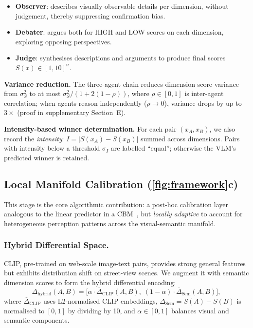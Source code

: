 \documentclass[runningheads]{llncs}
\begin{document}
\begin{itemize}
\item \textbf{Observer}: describes visually observable details per dimension, without judgement, thereby suppressing confirmation bias.
\item \textbf{Debater}: argues both for HIGH and LOW scores on each dimension, exploring opposing perspectives.
\item \textbf{Judge}: synthesises descriptions and arguments to produce final scores $S(x)\in[1,10]^{n}$.
\end{itemize}

\noindent\textbf{Variance reduction.}
The three-agent chain reduces dimension score variance from $\sigma_S^2$ to at most $\sigma_S^2/(1{+}2(1{-}\rho))$, where $\rho\in[0,1]$ is inter-agent correlation; when agents reason independently ($\rho{\to}0$), variance drops by up to $3\times$ (proof in supplementary Section~E).

\smallskip\noindent\textbf{Intensity-based winner determination.}
For each pair $(x_A, x_B)$, we also record the \emph{intensity}: $I{=}|S(x_A) - S(x_B)|$ summed across dimensions.
Pairs with intensity below a threshold $\sigma_I$ are labelled ``equal''; otherwise the VLM's predicted winner is retained.

\subsection{Local Manifold Calibration (\cref{fig:framework}c)}
\label{sec:stage3}

This stage is the core algorithmic contribution: a post-hoc calibration layer analogous to the linear predictor in a CBM~\cite{koh2020concept}, but \emph{locally adaptive} to account for heterogeneous perception patterns across the visual-semantic manifold.

\subsubsection{Hybrid Differential Space.}

CLIP, pre-trained on web-scale image-text pairs, provides strong general features but exhibits distribution shift on street-view scenes.
We augment it with semantic dimension scores to form the hybrid differential encoding:
\begin{equation}
\Delta_{\text{hybrid}}(A,B)=\bigl[\alpha\cdot\overline{\Delta}_{\text{CLIP}}(A,B),\;(1{-}\alpha)\cdot\overline{\Delta}_{\text{Sem}}(A,B)\bigr],
\label{eq:hybrid_diff}
\end{equation}
where $\overline{\Delta}_{\text{CLIP}}$ uses L2-normalised CLIP embeddings, $\Delta_{\text{Sem}}{=}S(A){-}S(B)$ is normalised to $[0,1]$ by dividing by 10, and $\alpha\in[0,1]$ balances visual and semantic components.
\end{document}
